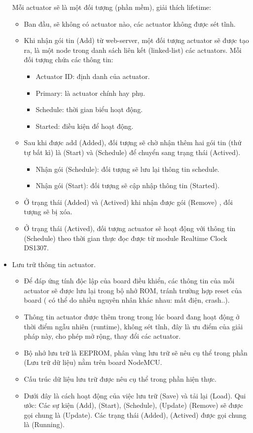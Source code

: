 \documentclass[a4paper,12pt,oneside]{article}
\begin{document}
\begin{itemize}
\noindent Mỗi actuator sẽ là một đối tượng (phần mềm), giải thích lifetime:
	\begin{itemize}
	\item Ban đầu, sẽ không có actuator nào, các actuator không được sét tĩnh.
	\item  Khi nhận gói tin (Add) từ web-server, một đối tượng actuator sẽ được tạo ra, là một node trong danh sách liên kết (linked-list) các actuators. Mỗi đối tượng chứa các thông tin:
\begin{itemize}
\item Actuator ID: định danh của actuator.
\item Primary: là actuator chính hay phụ.
\item Schedule: thời gian biểu hoạt động.
\item Started: điều kiện để hoạt động.
\end{itemize}

	\item Sau khi được add (Added), đối tượng sẽ chờ nhận thêm hai gói tin (thứ tự bất kì) là (Start) và (Schedule) để chuyển sang trạng thái (Actived).
		\begin{itemize}
			\item Nhận gói (Schedule): đối tượng sẽ lưu lại thông tin schedule.
			\item Nhận gói (Start): đối tượng sẽ cập nhập thông tin (Started). 
		\end{itemize}			

	\item Ở trạng thái (Added) và (Actived) khi nhận được gói (Remove) , đối tượng sẽ bị xóa.
	\item Ở trạng thái (Actived), đối tượng actuator sẽ hoạt động với thông tin (Schedule) theo thời gian thực đọc được từ module Realtime Clock DS1307.
	\end{itemize}
\item Lưu trữ thông tin actuator.

	\begin{itemize}
	\item Để đáp ứng tính độc lập của board điều khiển, các thông tin của mỗi actuator sẽ được lưu lại trong bộ nhớ ROM, tránh trường hợp reset của board ( có thể do nhiều nguyên nhân khác nhau: mất điện, crash..).
	\item Thông tin actuator được thêm trong trong lúc board đang hoạt động ở thời điểm ngẫu nhiên (runtime), không sét tĩnh, đây là ưu điểm của giải pháp này, cho phép mở rộng, thay đổi các actuator.
	\item Bộ nhớ lưu trữ là EEPROM, phân vùng lưu trữ sẽ nêu cụ thể trong phần (Lưu trữ dữ liệu) nằm trên board NodeMCU.
	\item Cấu trúc dữ liệu lưu trữ được nêu cụ thể trong phần hiện thực.
	\item Dưới đây là cách hoạt động của việc lưu trữ (Save) và tải lại (Load). Qui ước: Các sự kiện (Add), (Start), (Schedule), (Update) (Remove) sẽ được gọi chung là (Update). Các trạng thái (Added), (Actived) được gọi chung là (Running).
	 

\end{itemize}
\end{itemize}
\end{document}
